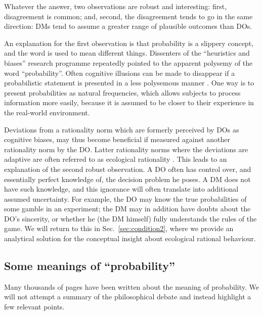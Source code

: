 \documentclass[a4paper, 12pt]{article}
\newcommand{\seclabel}[1]{\label{sec:#1}}
\newcommand{\secref}[1]{Sec.~\ref{sec:#1}}
\newcommand{\eg}{{\it e.g.}\ }
\begin{document}
Whatever the answer, two observations are robust and interesting: first, disagreement is common; and, second, the disagreement tends to go in the same direction: DMs tend to assume a greater range of plausible outcomes than DOs. 

An explanation for the first observation is that probability is a slippery concept, and the word is used to mean different things.
%
Dissenters of the ``heuristics and biases'' research programme repeatedly pointed to the apparent polysemy of the word ``probability''. Often cognitive illusions can be made to disappear if a probabilistic statement is presented in a less polysemous manner \citep{Gigerenzer1991,HertwigGigerenzer1999}.
% 
One way is to present probabilities as natural frequencies, which allows subjects to process information more easily, because it is assumed to be closer to their experience in the real-world environment.

Deviations from a rationality norm which are formerly perceived by DOs as cognitive biases, may thus become beneficial if measured against another rationality norm by the DO. Latter rationality norms where the deviations are adaptive are often referred to as ecological rationality \citep{GigerenzerSelten2002b,Smith2003}. This leads to an explanation of the second robust observation.
A DO often has control over, and essentially perfect knowledge of, the decision problem he poses. A DM does not have such knowledge, and this ignorance will often translate into additional assumed uncertainty. For example, the DO may know the true probabilities of some gamble in an experiment; the DM may in addition have doubts about the DO's sincerity, or whether he (the DM himself) fully understands the rules of the game. We will return to this in \secref{condition2}, where we provide an analytical solution for the conceptual insight about ecological rational behaviour.
\subsection{Some meanings of ``probability'' \seclabel{tricky}}
Many thousands of pages have been written about the meaning of probability. We will not attempt a summary of the philosophical debate and instead highlight a few relevant points.
\end{document}
